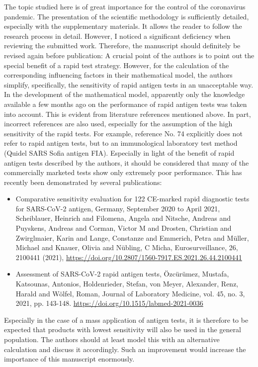 \documentclass[a4paper,11pt]{article}
\theoremstyle{plain}
\begin{document}
{The topic studied here is of great importance for the control of the coronavirus
pandemic. The presentation of the scientific methodology is sufficiently detailed,
especially with the supplementary materials. It allows the reader to follow the research
process in detail. However, I noticed a significant deficiency when reviewing the
submitted work. Therefore, the manuscript should definitely be revised again before
publication: A crucial point of the authors is to point out the special benefit of a
rapid test strategy. However, for the calculation of the corresponding influencing
factors in their mathematical model, the authors simplify, specifically, the sensitivity
of rapid antigen tests in an unacceptable way. In the development of the mathematical
model, apparently only the knowledge available a few months ago on the performance of
rapid antigen tests was taken into account. This is evident from literature references
mentioned above. In part, incorrect references are also used, especially for the
assumption of the high sensitivity of the rapid tests. For example, reference No. 74
explicitly does not refer to rapid antigen tests, but to an immunological laboratory
test method (Quidel SARS Sofia antigen FIA). Especially in light of the benefit of rapid
antigen tests described by the authors, it should be considered that many of the
commercially marketed tests show only extremely poor performance. This has recently been
demonstrated by several publications:
\begin{itemize}
    \item Comparative sensitivity evaluation for 122 CE-marked rapid diagnostic tests
          for SARS-CoV-2 antigen, Germany, September 2020 to April 2021, Scheiblauer,
          Heinrich and Filomena, Angela and Nitsche, Andreas and Puyskens, Andreas and
          Corman, Victor M and Drosten, Christian and Zwirglmaier, Karin and Lange,
          Constanze and Emmerich, Petra and Müller, Michael and Knauer, Olivia and
          Nübling, C Micha, Eurosurveillance, 26, 2100441 (2021),
          \url{https://doi.org/10.2807/1560-7917.ES.2021.26.44.2100441}
    \item Assessment of SARS-CoV-2 rapid antigen tests, Özcürümez, Mustafa, Katsounas,
          Antonios, Holdenrieder, Stefan, von Meyer, Alexander, Renz, Harald and Wölfel,
          Roman, Journal of Laboratory Medicine, vol. 45, no. 3, 2021, pp. 143-148.
          \url{https://doi.org/10.1515/labmed-2021-0036}
\end{itemize}

Especially in the case of a mass application of antigen tests, it is therefore to be
expected that products with lowest sensitivity will also be used in the general
population. The authors should at least model this with an alternative calculation and
discuss it accordingly. Such an improvement would increase the importance of this
manuscript enormously.

}
\end{document}
